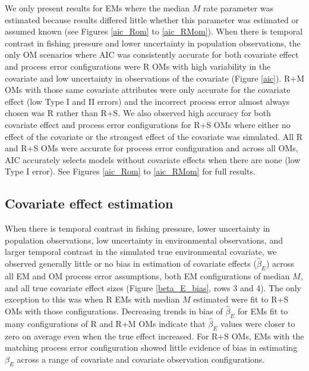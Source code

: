 \documentclass[
  12pt,
]{article}
\begin{document}
We only present results for EMs where the median \(M\) rate parameter was estimated because results differed little whether this parameter was estimated or assumed known (see Figures \ref{aic_Rom} to \ref{aic_RMom}). When there is temporal contrast in fishing pressure and lower uncertainty in population observations, the only OM scenarios where AIC was consistently accurate for both covariate effect and process error configurations were R OMs with high variability in the covariate and low uncertainty in observations of the covariate (Figure \ref{aic}). R+M OMs with those same covariate attributes were only accurate for the covariate effect (low Type I and II errors) and the incorrect process error almost always chosen was R rather than R+S. We also observed high accuracy for both covariate effect and process error configurations for R+S OMs where either no effect of the covariate or the strongest effect of the covariate was simulated. All R and R+S OMs were accurate for process error configuration and across all OMs, AIC accurately selects models without covariate effects when there are none (low Type I error). See Figures \ref{aic_Rom} to \ref{aic_RMom} for full results.

\hypertarget{covariate-effect-estimation}{%
\subsection*{Covariate effect estimation}\label{covariate-effect-estimation}}

When there is temporal contrast in fishing pressure, lower uncertainty in population observations, low uncertainty in environmental observations, and larger temporal contrast in the simulated true environmental covariate, we observed generally little or no bias in estimation of covariate effects (\(\widehat \beta_E\)) across all EM and OM process error assumptions, both EM configurations of median \(M\), and all true covariate effect sizes (Figure \ref{beta_E_bias}, rows 3 and 4). The only exception to this was when R EMs with median \(M\) estimated were fit to R+S OMs with those configurations. Decreasing trends in bias of \(\widehat \beta_E\) for EMs fit to many configurations of R and R+M OMs indicate that \(\widehat \beta_E\) values were closer to zero on average even when the true effect increased. For R+S OMs, EMs with the matching process error configuration showed little evidence of bias in estimating \(\beta_E\) across a range of covariate and covariate observation configurations.
\end{document}

